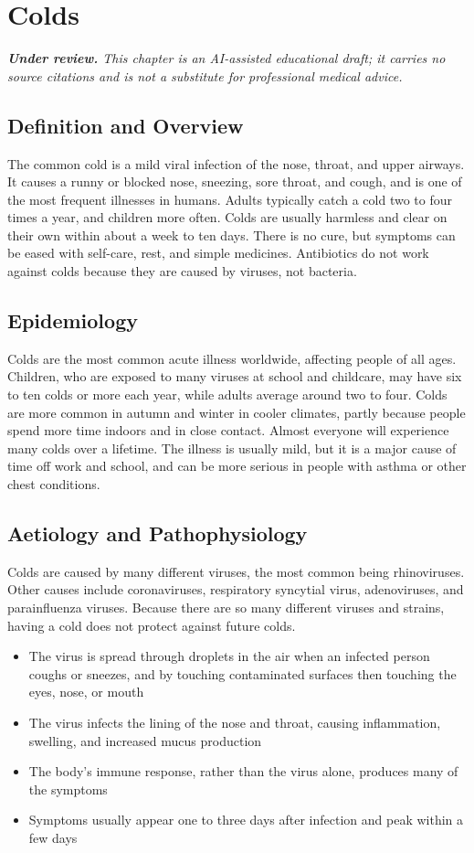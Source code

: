 \chapter{Colds}

\medskip
\noindent\textit{\textbf{Under review.} This chapter is an AI-assisted educational draft; it carries no source citations and is not a substitute for professional medical advice.}

\section*{Definition and Overview}
The common cold is a mild viral infection of the nose, throat, and upper airways. It causes a runny or blocked nose, sneezing, sore throat, and cough, and is one of the most frequent illnesses in humans. Adults typically catch a cold two to four times a year, and children more often. Colds are usually harmless and clear on their own within about a week to ten days. There is no cure, but symptoms can be eased with self-care, rest, and simple medicines. Antibiotics do not work against colds because they are caused by viruses, not bacteria.

\section*{Epidemiology}
Colds are the most common acute illness worldwide, affecting people of all ages. Children, who are exposed to many viruses at school and childcare, may have six to ten colds or more each year, while adults average around two to four. Colds are more common in autumn and winter in cooler climates, partly because people spend more time indoors and in close contact. Almost everyone will experience many colds over a lifetime. The illness is usually mild, but it is a major cause of time off work and school, and can be more serious in people with asthma or other chest conditions.

\section*{Aetiology and Pathophysiology}
Colds are caused by many different viruses, the most common being rhinoviruses. Other causes include coronaviruses, respiratory syncytial virus, adenoviruses, and parainfluenza viruses. Because there are so many different viruses and strains, having a cold does not protect against future colds.

\begin{itemize}
    \item The virus is spread through droplets in the air when an infected person coughs or sneezes, and by touching contaminated surfaces then touching the eyes, nose, or mouth
    \item The virus infects the lining of the nose and throat, causing inflammation, swelling, and increased mucus production
    \item The body's immune response, rather than the virus alone, produces many of the symptoms
    \item Symptoms usually appear one to three days after infection and peak within a few days
\end{itemize}

